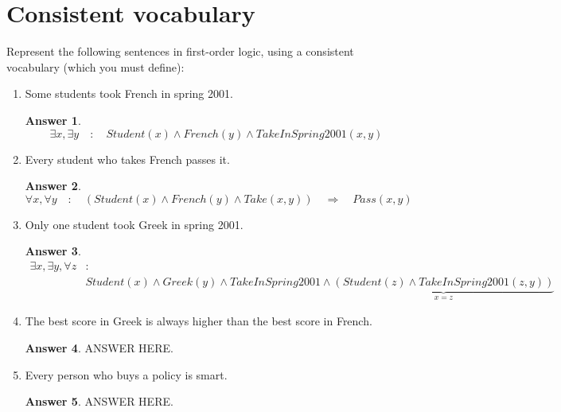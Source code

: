 \documentclass[a4paper]{article}
\renewcommand{\(}{\left(}
\renewcommand{\)}{\right)}
\theoremstyle{plain}
\theoremstyle{plain}
\theoremstyle{definition}
\newtheorem*{answer}{Answer}
\begin{document}
\section{Consistent vocabulary}
Represent the following sentences in first-order logic, using a consistent vocabulary (which you must define):
\begin{enumerate}[label*=\alph*.,ref=\alph*]
\item Some students took French in spring 2001.
\begin{shaded}
\begin{answer}
\begin{equation*}
  \exists x , \exists y \quad : \quad Student(x) \wedge French(y) \wedge TakeInSpring2001(x,y)
\end{equation*}
\end{answer}
\end{shaded}

\item Every student who takes French passes it.
\begin{shaded}
\begin{answer}
\begin{equation*}
  \forall x , \forall y \quad : \quad \left( Student(x) \wedge French(y) \wedge Take(x,y) \right) \quad \Rightarrow \quad Pass(x,y)
\end{equation*}
\end{answer}
\end{shaded}

\item Only one student took Greek in spring 2001.
\begin{shaded}
\begin{answer}
\begin{align*}
    \exists x , \exists y , \forall z &: \\
 & Student(x) \wedge Greek(y) \wedge TakeInSpring2001 \wedge \underbrace{(Student(z) \wedge TakeInSpring2001(z,y))}_{x = z}
\end{align*}
\end{answer}
\end{shaded}

\item The best score in Greek is always higher than the best score in French.
\begin{shaded}
\begin{answer}
ANSWER HERE.
\end{answer}
\end{shaded}

\item Every person who buys a policy is smart.
\begin{shaded}
\begin{answer}
ANSWER HERE.
\end{answer}
\end{shaded}


\end{enumerate}
\end{document}
